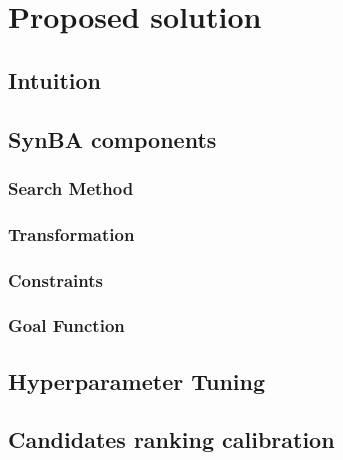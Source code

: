 \section{Proposed solution}\label{sec:proposed-solution}


\subsection{Intuition}\label{subsec:intuition}


\subsection{SynBA components}\label{subsec:synba-components}


\subsubsection{Search Method}\label{subsubsec:search-method}


\subsubsection{Transformation}\label{subsubsec:transformation}


\subsubsection{Constraints}\label{subsubsec:constraints}


\subsubsection{Goal Function}\label{subsubsec:goal-function}


\subsection{Hyperparameter Tuning}\label{subsec:hyperparameter-tuning}


\subsection{Candidates ranking calibration}\label{subsec:candidates-ranking-calibration}

